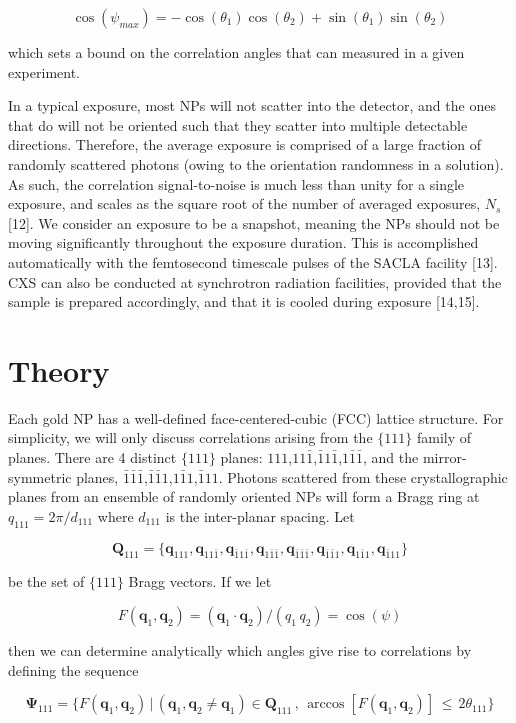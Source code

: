 \documentclass [11pt,fleqn]{article}
\def \be {\begin{equation}}
\def \ee {\end{equation}}
\begin{document}
\be \label{psimax}
\cos(\psi_{max}) = - \cos( \theta_1)\cos(\theta_2) + \sin(\theta_1)\sin(\theta_2)
\ee


which sets a bound on the correlation angles that can measured in a given experiment. 

In a typical exposure, most NPs will not scatter into the detector, and the ones that do will not be oriented such that they scatter into multiple detectable directions. Therefore, the average exposure is comprised of a large fraction of randomly scattered photons (owing to the orientation randomness in  a solution). As such, the correlation signal-to-noise is much less than unity for a single exposure, and scales as the square root of the number of averaged exposures, $N_s$ [12]. We consider an exposure to be a snapshot, meaning the NPs should not be moving significantly throughout the exposure duration. This is accomplished automatically with the femtosecond timescale pulses of the SACLA facility [13].  CXS can also be conducted at synchrotron radiation facilities, provided  that the sample is prepared accordingly, and that it is cooled during exposure [14,15]. 

\section{Theory}
Each gold NP has a well-defined face-centered-cubic (FCC) lattice structure. For simplicity, we will only discuss correlations arising from the $\{111\}$ family of planes. There are 4 distinct $\{111\}$ planes: $111$,$11\bar 1$,$\bar 1 1\bar 1$,$1\bar 1 \bar 1$, and the mirror-symmetric planes, $\bar 1\bar 1\bar 1$,$\bar 1\bar 1 1$,$1 \bar 11$,$\bar 1 1 1$.  Photons scattered from these crystallographic planes from an ensemble of randomly oriented NPs will form a Bragg ring at  $q_{111} = 2\pi / d_{111} $ where $d_{111}$ is the inter-planar spacing. Let 

\be
\bm Q_{111} = \{\bm q_{111}, \bm q_{11\bar 1},\bm q_{\bar 1 1\bar 1},\bm q_{1\bar 1 \bar 1},\bm q_{\bar 1\bar 1\bar 1},\bm q_{\bar 1\bar 1 1},\bm q_{1 \bar 11},\bm q_{\bar 1 1 1}\}
\ee

be the set of $\{111\}$ Bragg vectors. If we let 

\be
F( \bm q_1, \bm q_2) =  (\bm q_1 \cdot \bm q_2)/(q_1 \, q_2 ) = \cos( \psi )
\ee

then we can determine analytically which angles give rise to correlations by defining the sequence

\be \label{psiset}
\bm \Psi_{111} = \{ F( \bm q_1, \bm q_2)\, \big | \, (\bm q_1, \bm q_2 \ne \bm q_1) \in \bm Q_{111}\, ,\,  \arccos [F( \bm q_1, \bm q_2)]  \, \le \,  2\theta_{111}   \}
\ee 
\end{document}
